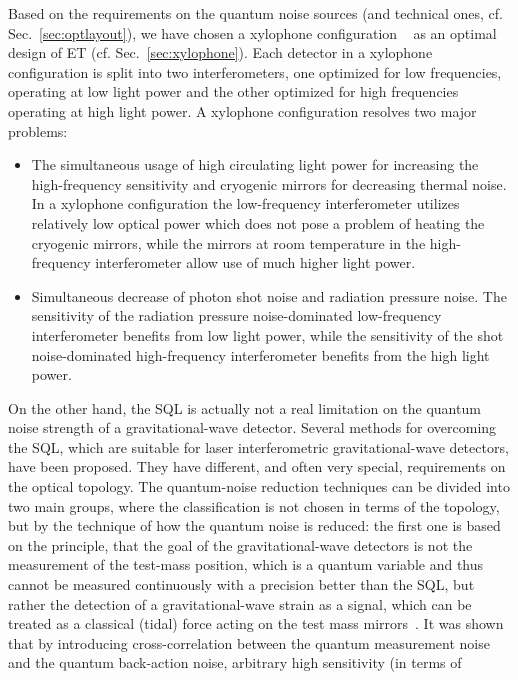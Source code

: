 {Based on the requirements on the quantum noise sources (and technical ones, cf. Sec.~\ref{sec:optlayout}), we have chosen a xylophone configuration ~\cite{Hild2010a} as an optimal design of ET (cf. Sec.~\ref{sec:xylophone}). Each detector in a xylophone configuration is split into two interferometers, one optimized for low frequencies, operating at low light power and the other optimized for high frequencies operating at high light power. A xylophone configuration resolves two major problems:
\begin{itemize}
\item The simultaneous usage of high circulating light power for increasing the high-frequency sensitivity and cryogenic mirrors for decreasing thermal noise. In a xylophone configuration the low-frequency interferometer utilizes relatively low optical power which does not pose a problem of heating the cryogenic mirrors, while the mirrors at room temperature in the high-frequency interferometer allow use of much higher light power.
\item Simultaneous decrease of photon shot noise and radiation pressure noise. The sensitivity of the radiation pressure noise-dominated low-frequency interferometer benefits from low light power, while the sensitivity of the shot noise-dominated high-frequency interferometer benefits from the high light power.
\end{itemize}}
On the other hand, the SQL is actually not a real limitation on
the quantum noise strength of a gravitational-wave detector.
Several methods for overcoming the SQL, which are suitable for
laser interferometric gravitational-wave detectors, have been
proposed. They have different, and often very special,
requirements on the optical topology. The quantum-noise reduction
techniques can be divided into two main groups, where the
classification is not chosen in terms of the topology, but by the
technique of how the quantum noise is reduced: the first one is
based on the principle, that the goal of the gravitational-wave
detectors is not the measurement of the test-mass position, which
is a quantum variable and thus cannot be measured continuously
with a precision better than the SQL, but rather the detection of
a gravitational-wave strain as a signal, which can be treated as a
classical (tidal) force acting on the test mass
mirrors~\cite{Braginsky2003}. It was shown that by introducing
cross-correlation between the quantum measurement noise and the
quantum back-action noise, arbitrary high sensitivity (in terms of
